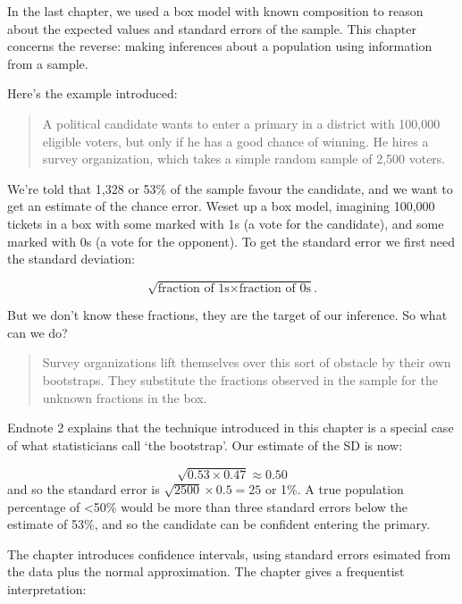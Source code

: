 \documentclass[
]{book}
\begin{document}
In the last chapter, we used a box model with known composition to reason about the expected values and standard errors of the sample. This chapter concerns the reverse: making inferences about a population using information from a sample.

Here's the example introduced:

\begin{quote}
A political candidate wants to enter a primary in a district with 100,000 eligible voters, but only if he has a good chance of winning. He hires a survey organization, which takes a simple random sample of 2,500 voters.
\end{quote}

We're told that 1,328 or 53\% of the sample favour the candidate, and we want to get an estimate of the chance error. Weset up a box model, imagining 100,000 tickets in a box with some marked with 1s (a vote for the candidate), and some marked with 0s (a vote for the opponent). To get the standard error we first need the standard deviation:

\[
\sqrt{\text{fraction of 1s} \times \text{fraction of 0s}}.
\]

But we don't know these fractions, they are the target of our inference. So what can we do?

\begin{quote}
Survey organizations lift themselves over this sort of obstacle by their own bootstraps. They substitute the fractions observed in the sample for the unknown fractions in the box.
\end{quote}

Endnote 2 explains that the technique introduced in this chapter is a special case of what statisticians call `the bootstrap'. Our estimate of the SD is now:

\[
\sqrt{0.53 \times 0.47} \approx 0.50
\]
and so the standard error is \(\sqrt{2500} \times 0.5 = 25\) or 1\%. A true population percentage of \textless50\% would be more than three standard errors below the estimate of 53\%, and so the candidate can be confident entering the primary.

The chapter introduces confidence intervals, using standard errors esimated from the data plus the normal approximation. The chapter gives a frequentist interpretation:
\end{document}

